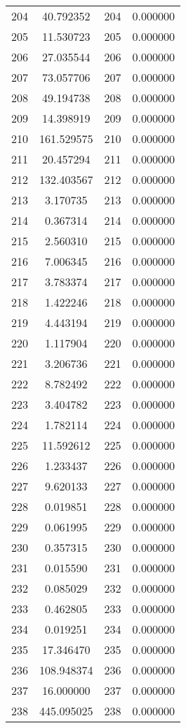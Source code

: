 \documentclass[12pt]{article}
\begin{document}
\begin{longtable}{@{}cccc@{}}
204 & 40.792352 & 204 & 0.000000 \\
205 & 11.530723 & 205 & 0.000000 \\
206 & 27.035544 & 206 & 0.000000 \\
207 & 73.057706 & 207 & 0.000000 \\
208 & 49.194738 & 208 & 0.000000 \\
209 & 14.398919 & 209 & 0.000000 \\
210 & 161.529575 & 210 & 0.000000 \\
211 & 20.457294 & 211 & 0.000000 \\
212 & 132.403567 & 212 & 0.000000 \\
213 & 3.170735 & 213 & 0.000000 \\
214 & 0.367314 & 214 & 0.000000 \\
215 & 2.560310 & 215 & 0.000000 \\
216 & 7.006345 & 216 & 0.000000 \\
217 & 3.783374 & 217 & 0.000000 \\
218 & 1.422246 & 218 & 0.000000 \\
219 & 4.443194 & 219 & 0.000000 \\
220 & 1.117904 & 220 & 0.000000 \\
221 & 3.206736 & 221 & 0.000000 \\
222 & 8.782492 & 222 & 0.000000 \\
223 & 3.404782 & 223 & 0.000000 \\
224 & 1.782114 & 224 & 0.000000 \\
225 & 11.592612 & 225 & 0.000000 \\
226 & 1.233437 & 226 & 0.000000 \\
227 & 9.620133 & 227 & 0.000000 \\
228 & 0.019851 & 228 & 0.000000 \\
229 & 0.061995 & 229 & 0.000000 \\
230 & 0.357315 & 230 & 0.000000 \\
231 & 0.015590 & 231 & 0.000000 \\
232 & 0.085029 & 232 & 0.000000 \\
233 & 0.462805 & 233 & 0.000000 \\
234 & 0.019251 & 234 & 0.000000 \\
235 & 17.346470 & 235 & 0.000000 \\
236 & 108.948374 & 236 & 0.000000 \\
237 & 16.000000 & 237 & 0.000000 \\
238 & 445.095025 & 238 & 0.000000 \\

\end{longtable}
\end{document}
